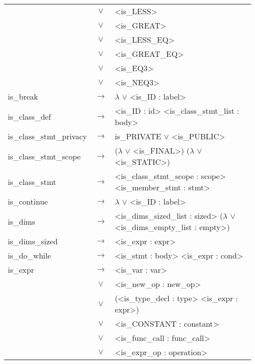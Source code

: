 \documentclass[a4paper]{article}
\begin{document}
\begin{longtable}{lcl}
								& $\vee$ & <is\_LESS> \\
								& $\vee$ & <is\_GREAT> \\
								& $\vee$ & <is\_LESS\_EQ> \\
								& $\vee$ & <is\_GREAT\_EQ> \\
								& $\vee$ & <is\_EQ3> \\
								& $\vee$ & <is\_NEQ3> \\
	is\_break 					& $\to$ & $\lambda$ $\vee$ <is\_ID : label> \\
	is\_class\_def				& $\to$ & <is\_ID : id> <is\_class\_stmt\_list : body> \\
	is\_class\_stmt\_privacy	& $\to$ & is\_PRIVATE $\vee$ <is\_PUBLIC>\\	
	is\_class\_stmt\_scope		& $\to$ &($\lambda$ $\vee$ <is\_FINAL>) ($\lambda$ $\vee$ <is\_STATIC>) \\
	is\_class\_stmt 			& $\to$ & <is\_class\_stmt\_scope : scope> <is\_member\_stmt : stmt> \\
	is\_continue				& $\to$ & $\lambda$ $\vee$ <is\_ID : label> \\
	is\_dims					& $\to$ & <is\_dims\_sized\_list : sized> ($\lambda$ $\vee$ <is\_dims\_empty\_list : empty>) \\
	is\_dims\_sized				& $\to$ & <is\_expr : expr> \\
	is\_do\_while				& $\to$ & <is\_stmt : body> <is\_expr : cond> \\
	is\_expr					& $\to$ & <is\_var : var> \\
								& $\vee$ & <is\_new\_op : new\_op> \\
								& $\vee$ & (<is\_type\_decl : type> <is\_expr : expr>) \\
								& $\vee$ & <is\_CONSTANT : constant> \\
								& $\vee$ & <is\_func\_call : func\_call> \\
								& $\vee$ & <is\_expr\_op : operation> \\


\end{longtable}
\end{document}
